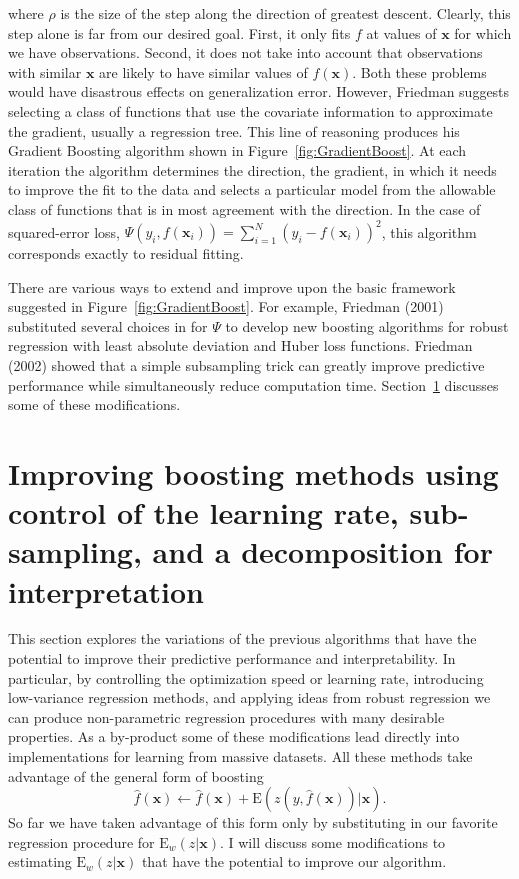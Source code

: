 \documentclass{article}
\newcommand{\EV}{\mathrm{E}}
\begin{document}
where $\rho$ is the size of the step along the direction of greatest descent. Clearly, this step alone is far from our desired goal. First, it only fits $f$ at values of $\mathbf{x}$ for which we have observations.  Second, it does not take into account that observations with similar $\mathbf{x}$ are likely to have similar values of $f(\mathbf{x})$. Both these problems would have disastrous effects on generalization error. However, Friedman suggests selecting a class of functions that use the covariate information to approximate the gradient, usually a regression tree. This line of reasoning produces his Gradient Boosting algorithm shown in Figure~\ref{fig:GradientBoost}. At each iteration the algorithm determines the direction, the gradient, in which it needs to improve the fit to the data and selects a particular model from the allowable class of functions that is in most agreement with the direction. In the case of squared-error loss, $\Psi(y_i,f(\mathbf{x}_i)) = \sum_{i=1}^N (y_i-f(\mathbf{x}_i))^2$, this algorithm corresponds exactly to residual fitting.

There are various ways to extend and improve upon the basic framework suggested in Figure~\ref{fig:GradientBoost}. For example, Friedman (2001) substituted several choices in for $\Psi$ to develop new boosting algorithms for robust regression with least absolute deviation and Huber loss functions. Friedman (2002) showed that a simple subsampling trick can greatly improve predictive performance while simultaneously reduce computation time. Section~\ref{GBMModifications} discusses some of these modifications.

\section{Improving boosting methods using control of the learning rate, sub-sampling, and a decomposition for interpretation}
\label{GBMModifications}

This section explores the variations of the previous algorithms that have the
potential to improve their predictive performance and interpretability. In
particular, by controlling the optimization speed or learning rate,
introducing low-variance regression methods, and applying ideas from robust
regression we can produce non-parametric regression procedures with many
desirable properties. As a by-product some of these modifications lead
directly into implementations for learning from massive datasets. All these
methods take advantage of the general form of boosting
\begin{equation}
\hat f(\mathbf{x}) \leftarrow \hat f(\mathbf{x}) + \EV(z(y,\hat f(\mathbf{x}))|\mathbf{x}).
\end{equation}
So far we have taken advantage of this form only by substituting in our favorite regression procedure for $\EV_w(z|\mathbf{x})$. I will discuss some modifications to estimating $\EV_w(z|\mathbf{x})$ that have the potential to improve our algorithm.
\end{document}
